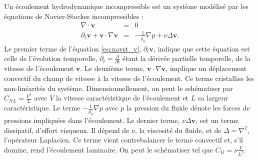 Un écoulement hydrodynamique incompressible est un système modélisé par les équations de Navier-Stockes incompressibles :
\begin{eqnarray}
\label{eq:navst_r} \nabla \cdot \boldsymbol{v} & =& 0 \\
\label{eq:navst_v} \partial_t \boldsymbol{v} + \boldsymbol{v} \cdot \nabla \boldsymbol{v} &=& - \frac{1}{\rho_0} \nabla p + \nu \Delta \boldsymbol{v}.
\end{eqnarray}
Le premier terme de l'équation \eqref{eq:navst_v}, $\partial_t \boldsymbol{v}$, indique que cette équation est celle de l'évolution temporelle, $\partial_t = \frac{\partial}{\partial t}$ étant la dérivée partielle temporelle, de la vitesse de l'écoulement $\boldsymbol{v}$.
Le deuxième terme, $\boldsymbol{v} \cdot \nabla \boldsymbol{v}$, implique un déplacement convectif du champ de vitesse à la vitesse de l'écoulement. Ce terme cristallise les non-linéarités du système. Dimensionnellement, on peut le schématiser par $C_{NL} = \frac{V^2}{L}$ avec $V$ la vitesse caractéristique de l'écoulement et $L$ sa largeur caractéristique.
Le terme $- \frac{1}{\rho_0} \nabla p $ avec $p$ la pression du fluide dénote les forces de pressions impliquées dans l'écoulement.
Le dernier terme, $\nu \Delta \boldsymbol{v}$, est un terme dissipatif, d'effort visqueux. Il dépend de $\nu$, la viscosité du fluide, et de $\Delta = \nabla^2$, l'opérateur Laplacien. Ce terme vient contrebalancer le terme convectif et, s'il domine, rend l'écoulement laminaire. On peut le schématiser tel que $C_{D} = \nu \frac{V}{L^2}$.

